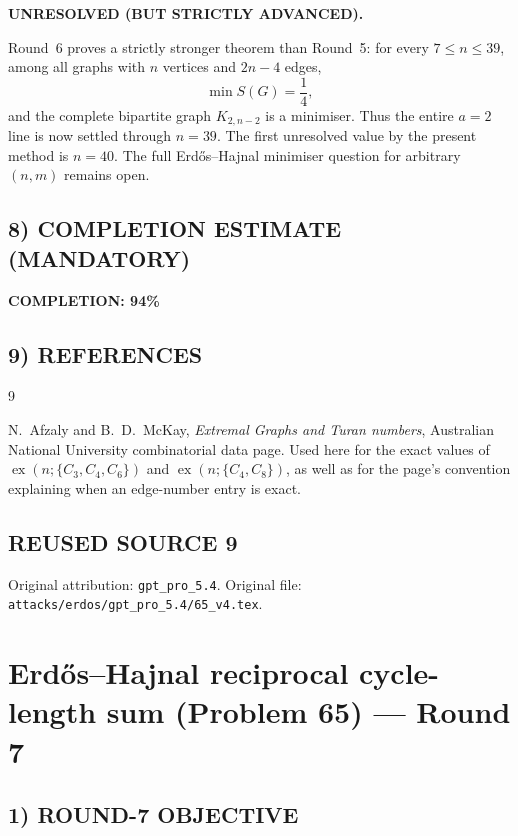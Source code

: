 \textbf{UNRESOLVED (BUT STRICTLY ADVANCED).}

Round~6 proves a strictly stronger theorem than Round~5:
for every $7\le n\le 39$, among all graphs with $n$ vertices and $2n-4$ edges,
\[
\min S(G)=\frac14,
\]
and the complete bipartite graph $K_{2,n-2}$ is a minimiser.
Thus the entire $a=2$ line is now settled through $n=39$.
The first unresolved value by the present method is $n=40$.
The full Erd\H{o}s--Hajnal minimiser question for arbitrary $(n,m)$ remains open.

\subsection*{8) COMPLETION ESTIMATE (MANDATORY)}

\textbf{COMPLETION: 94\%}

\subsection*{9) REFERENCES}

\begin{thebibliography}{9}

N.~Afzaly and B.~D.~McKay,
\emph{Extremal Graphs and Turan numbers},
Australian National University combinatorial data page.
Used here for the exact values of
$\operatorname{ex}(n;\{C_3,C_4,C_6\})$
and
$\operatorname{ex}(n;\{C_4,C_8\})$,
as well as for the page's convention explaining when an edge-number entry is exact.

\end{thebibliography}


\subsection*{REUSED SOURCE 9}
Original attribution: \texttt{gpt\_pro\_5.4}.
Original file: \texttt{attacks/erdos/gpt\_pro\_5.4/65\_v4.tex}.

\section{Erd\H{o}s--Hajnal reciprocal cycle-length sum (Problem 65) --- Round 7}

\subsection*{1) ROUND-7 OBJECTIVE}

